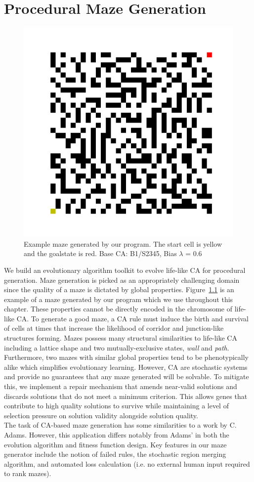 \chapter{Procedural Maze Generation} \label{procedural}
\begin{figure}[!h]
\centering
    \includegraphics[width=.4\textwidth]{images/maze_example.png}
    \caption{Example maze generated by our program. The start cell is yellow and the goalstate is red. Base CA: B1/S2345, Bias $\lambda$ = 0.6}
\label{fig:maze-example}
\end{figure}
We build an evolutionary algorithm toolkit to evolve life-like CA for procedural generation. Maze generation is picked as an appropriately challenging domain since the quality of a maze is dictated by global properties. Figure~\ref{fig:maze-example} is an example of a maze generated by our program which we use throughout this chapter. These properties cannot be directly encoded in the chromosome of life-like CA. To generate a good maze, a CA rule must induce the birth and survival of cells at times that increase the likelihood of corridor and junction-like structures forming. Mazes possess many structural similarities to life-like CA including a lattice shape and two mutually-exclusive states, \textit{wall} and \textit{path}. Furthermore, two mazes with similar global properties tend to be phenotypically alike which simplifies evolutionary learning. However, CA are stochastic systems and provide no guarantees that any maze generated will be solvable. To mitigate this, we implement a repair mechanism that amends near-valid solutions and discards solutions that do not meet a minimum criterion. This allows genes that contribute to high quality solutions to survive while maintaining a level of selection pressure on solution validity alongside solution quality.\\

The task of CA-based maze generation has some similarities to a work by C. Adams\cite{adams2018evolving}. However, this application differs notably from Adams' in both the evolution algorithm and fitness function design. Key features in our maze generator include the notion of failed rules, the stochastic region merging algorithm, and automated loss calculation (i.e. no external human input required to rank mazes).\\

